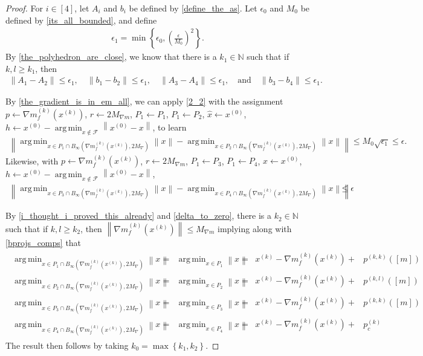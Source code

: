 \documentclass{article}
\theoremstyle{case}
\numberwithin{theorem}{subsection}
\DeclareMathOperator*{\argmin}{arg\,min}
\newcommand{\feasible}{{\mathcal F}}
\newcommand{\gk}{{\nabla m_f^{(k)}\left(\xk\right)}}
\newcommand{\maxgrad}{{M_{\nabla}}}
\newcommand{\naturals}{\mathbb N}
\newcommand{\xk}{x^{(k)}}
\newcommand{\xinit}{{x^{(0)}}}
\newcommand{\projkl}{{p^{(k,l)}}}
\newcommand{\projkk}{{p^{(k,k)}}}
\newcommand{\trueprojk}{{p_c^{(k)}}}
\newcommand{\maxmodelgrad}{{M_{\nabla m}}}
\begin{document}
\begin{proof}
For $i \in [4]$, let $A_i$ and $b_i$ be defined by \cref{define_the_as}.
Let $\epsilon_0$ and $M_0$ be defined by \cref{its_all_bounded},
and define
\begin{align*}
\epsilon_1 = \min\left\{ \epsilon_0, \left(\frac{\epsilon}{M_0}\right)^2\right\}.
\end{align*}
By \cref{the_polyhedron_are_close}, we know that there is a $k_1 \in \naturals$ such that if $k, l \ge k_1$, then
\begin{align*}
\left\|A_1 - A_2\right\| \le \epsilon_1, \quad
\left\|b_1 - b_2\right\| \le \epsilon_1, \quad
\left\|A_3 - A_4\right\| \le \epsilon_1, \quad \textrm{and} \quad
\left\|b_3 - b_4\right\| \le \epsilon_1.
\end{align*}

By \cref{the_gradient_is_in_em_all}, we can apply \cref{2_2} with the assignment
$p \gets \gk$, $r \gets 2\maxmodelgrad$, $P_1 \gets P_1$, $P_1 \gets P_2$, $\hat x \gets \xinit$,
$h \gets \xinit - \argmin_{x \not \in \feasible} \left\|\xinit - x\right\|$,
to learn
\begin{align*}
\left\|
\argmin_{x \in P_1 \cap B_{\infty}\left(\gk, 2\maxgrad\right)} \left\|x\right\|
-
\argmin_{x \in P_2 \cap B_{\infty}\left(\gk, 2\maxgrad\right)} \left\|x\right\|
\right\|
\le M_0 \sqrt{\epsilon_1} \le \epsilon.
\end{align*}
Likewise, with
$p \gets \gk$, $r \gets 2\maxmodelgrad$, $P_1 \gets P_3$, $P_1 \gets P_4$, $\hat x \gets \xinit$,
$h \gets \xinit - \argmin_{x \not \in \feasible} \left\|\xinit - x\right\|$,
\begin{align*}
\left\|
\argmin_{x \in P_3 \cap B_{\infty}\left(\gk, 2\maxgrad\right)} \left\|x\right\|
-
\argmin_{x \in P_4 \cap B_{\infty}\left(\gk, 2\maxgrad\right)} \left\|x\right\|
\right\|
\le \epsilon
\end{align*}

By \cref{i_thought_i_proved_this_already} and \cref{delta_to_zero}, there is a $k_2 \in \naturals$ such that if $k, l \ge k_2$, then
$\left\|\gk\right\| \le \maxmodelgrad$
implying along with \cref{bprojs_comps} that
\begin{align*}
\begin{array}{cccccc}
\argmin_{x \in P_1 \cap B_{\infty}\left(\gk, 2\maxgrad\right)} \left\|x\right\|
&=& \argmin_{x \in P_1} \left\|x\right\| 
&=& \xk - \gk + &\projkk\left([m]\right)
\\
\argmin_{x \in P_2 \cap B_{\infty}\left(\gk, 2\maxgrad\right)} \left\|x\right\|
&=&\argmin_{x \in P_2} \left\|x\right\| 
&=& \xk - \gk + &\projkl\left([m]\right)
\\
\argmin_{x \in P_3 \cap B_{\infty}\left(\gk, 2\maxgrad\right)} \left\|x\right\|
&=&\argmin_{x \in P_3} \left\|x\right\| 
&=& \xk - \gk + &\projkk\left([m]\right)
\\
\argmin_{x \in P_4 \cap B_{\infty}\left(\gk, 2\maxgrad\right)} \left\|x\right\|
&=& \argmin_{x \in P_4} \left\|x\right\| 
&=& \xk - \gk + &\trueprojk
\end{array}
\end{align*}
The result then follows by taking $k_0 = \max\left\{k_1, k_2\right\}$.
\end{proof}
\end{document}
